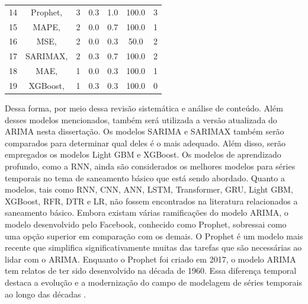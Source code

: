 \begin{table}[htb]
\begin{tabular}{ccccccc}
		14 & Prophet, \citeonline{2-s2.0-85092514286} & 3 & 0.3 & 1.0 & 100.0 & 3 \\
		15 & MAPE, \citeonline{2-s2.0-85097173237} & 2 & 0.0 & 0.7 & 100.0 & 1 \\
		16 & MSE, \citeonline{2-s2.0-85096470870} & 2 & 0.0 & 0.3 & 50.0 & 2 \\
		17 & SARIMAX,\citeonline{2-s2.0-85099424908} & 2 & 0.3 & 0.7 & 100.0 & 2 \\
		18 & MAE, \citeonline{2-s2.0-85082955699} & 1 & 0.0 & 0.3 & 100.0 & 1 \\
		19 & XGBoost, \citeonline{2-s2.0-85130441623} & 1 & 0.3 & 0.3 & 100.0 & 0 \\
		\bottomrule
	\end{tabular}
	
	
	
\end{table}


Dessa forma, por meio dessa revisão sistemática e análise de conteúdo.
Além desses modelos mencionados, também será utilizada a versão atualizada do ARIMA nesta dissertação. Os modelos SARIMA e SARIMAX também serão comparados para determinar qual deles é o mais adequado. Além disso, serão empregados os modelos Light GBM e XGBoost. Os modelos de aprendizado profundo, como a RNN, ainda são considerados os melhores modelos para séries temporais no tema de saneamento básico que está sendo abordado.
Quanto a modelos, tais como RNN, CNN, ANN, LSTM, Transformer, GRU, Light GBM, XGBoost, RFR, DTR e LR, não fossem encontrados na literatura relacionados a  saneamento básico. 
Embora existam várias ramificações do modelo ARIMA, o modelo desenvolvido pelo Facebook, conhecido como Prophet, sobressai como uma opção superior em comparação com os demais. O Prophet é um modelo mais recente que simplifica significativamente muitas das tarefas que são necessárias ao lidar com o ARIMA. Enquanto o Prophet foi criado em 2017, o modelo ARIMA tem relatos de ter sido desenvolvido na década de 1960. Essa diferença temporal destaca a evolução e a modernização do campo de modelagem de séries temporais ao longo das décadas \cite{ramos2010previsoes}.











